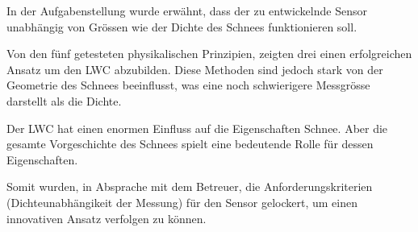 In der Aufgabenstellung wurde erwähnt, dass der zu entwickelnde Sensor unabhängig von Grössen wie der Dichte des Schnees funktionieren soll.

Von den fünf getesteten physikalischen Prinzipien, zeigten drei einen erfolgreichen Ansatz um den LWC abzubilden. Diese Methoden sind jedoch stark von der Geometrie des Schnees beeinflusst, was eine noch schwierigere Messgrösse darstellt als die Dichte.

Der LWC hat einen enormen Einfluss auf die Eigenschaften Schnee. Aber die gesamte Vorgeschichte des Schnees spielt eine bedeutende Rolle für dessen Eigenschaften.

Somit wurden, in Absprache mit dem Betreuer, die Anforderungskriterien (Dichteunabhängikeit der Messung) für den Sensor gelockert, um einen innovativen Ansatz verfolgen zu können.
